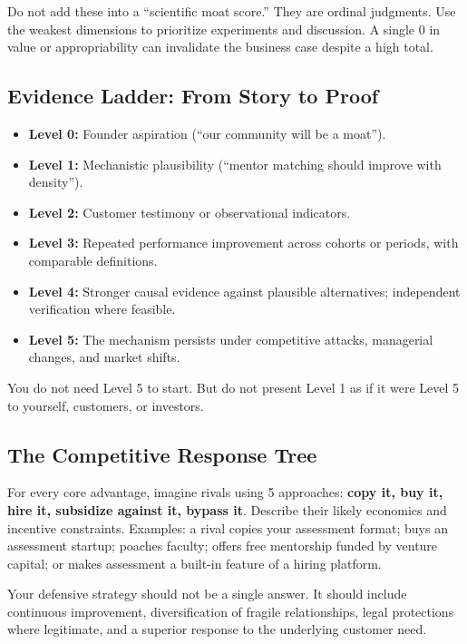 Do not add these into a ``scientific moat score.'' They are ordinal judgments. Use the weakest dimensions to prioritize experiments and discussion. A single 0 in value or appropriability can invalidate the business case despite a high total.

\subsection{Evidence Ladder: From Story to Proof}
\label{sec:evidence_ladder}

\begin{itemize}
    \item \textbf{Level 0:} Founder aspiration (``our community will be a moat'').
    \item \textbf{Level 1:} Mechanistic plausibility (``mentor matching should improve with density'').
    \item \textbf{Level 2:} Customer testimony or observational indicators.
    \item \textbf{Level 3:} Repeated performance improvement across cohorts or periods, with comparable definitions.
    \item \textbf{Level 4:} Stronger causal evidence against plausible alternatives; independent verification where feasible.
    \item \textbf{Level 5:} The mechanism persists under competitive attacks, managerial changes, and market shifts.
\end{itemize}

You do not need Level 5 to start. But do not present Level 1 as if it were Level 5 to yourself, customers, or investors.

\subsection{The Competitive Response Tree}
\label{sec:competitive_response_tree}

For every core advantage, imagine rivals using 5 approaches: \textbf{copy it, buy it, hire it, subsidize against it, bypass it}. Describe their likely economics and incentive constraints. Examples: a rival copies your assessment format; buys an assessment startup; poaches faculty; offers free mentorship funded by venture capital; or makes assessment a built-in feature of a hiring platform.

Your defensive strategy should not be a single answer. It should include continuous improvement, diversification of fragile relationships, legal protections where legitimate, and a superior response to the underlying customer need.

